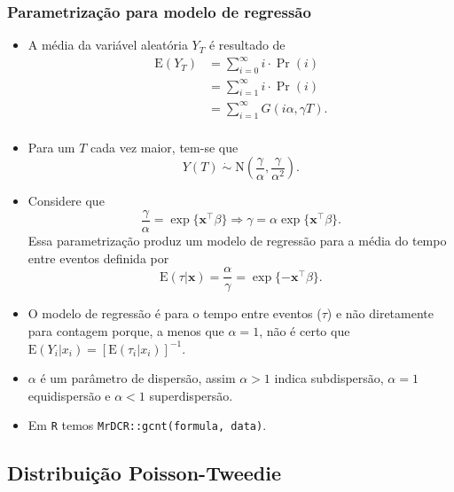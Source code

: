 \documentclass[10pt, aspectratio=169]{beamer}\usepackage[]{graphicx}\usepackage[]{color}
\begin{document}
\begin{frame}[allowframebreaks]
  \frametitle{Parametrização para modelo de regressão}
  \begin{itemize}
  \item A média da variável aleatória $Y_T$ é resultado de
    \begin{align*}
      \mathrm{E}(Y_T) &= \sum_{i=0}^{\infty} i\cdot \Pr(i) \\
           &= \sum_{i=1}^{\infty} i\cdot \Pr(i)\\
           &= \sum_{i=1}^{\infty} G(i\alpha, \gamma T).\\
    \end{align*}
  \item Para um $T$ cada vez maior, tem-se que
    \begin{equation*}
      Y(T)\; \dot{\sim}\; \text{N}\left(
        \frac{\gamma}{\alpha},
        \frac{\gamma}{\alpha^2}\right).
    \end{equation*}
  \item Considere que
    $$\frac{\gamma}{\alpha} = \exp\{\boldsymbol{x}^{\top}\beta\} \Rightarrow
    \gamma = \alpha \exp\{\boldsymbol{x}^{\top}\beta\}.$$
    Essa parametrização produz um modelo de regressão para a média
    do tempo entre eventos definida por
    $$\text{E}(\tau|\boldsymbol{x}) = \frac{\alpha}{\gamma} =
    \exp\{-\boldsymbol{x}^{\top}\beta\}.$$
  \item O modelo de regressão é para o tempo entre eventos ($\tau$)
    e não diretamente para contagem porque, a menos que
    $\alpha = 1$, não é certo que
    $\text{E}(Y_i|x_i) = [\text{E}(\tau_i|x_i)]^{-1}$.
  \item $\alpha$ é um parâmetro de dispersão, assim $\alpha > 1$ indica
  subdispersão, $\alpha = 1$ equidispersão e $\alpha < 1$ superdispersão.
  \item Em \texttt{R} temos \texttt{MrDCR::gcnt(formula, data)}.
  \end{itemize}
  
\end{frame}

\subsection{Distribuição Poisson-Tweedie}
\end{document}
